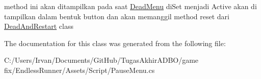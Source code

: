 method ini akan ditampilkan pada saat \hyperlink{class_dead_menu}{Dead\+Menu} di\+Set menjadi Active akan di tampilkan dalam bentuk button dan akan memanggil method reset dari \hyperlink{class_dead_and_restart}{Dead\+And\+Restart} class 



The documentation for this class was generated from the following file\+:\begin{DoxyCompactItemize}
\item 
C\+:/\+Users/\+Irvan/\+Documents/\+Git\+Hub/\+Tugas\+Akhir\+A\+D\+B\+O/game fix/\+Endless\+Runner/\+Assets/\+Script/Pause\+Menu.\+cs\end{DoxyCompactItemize}
